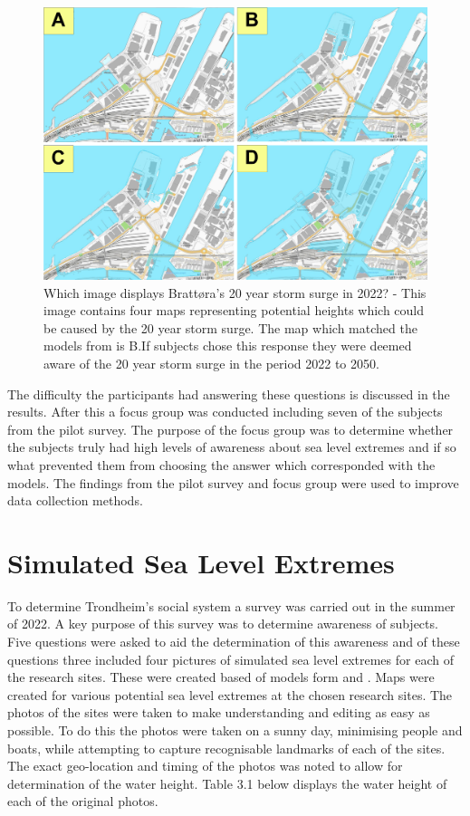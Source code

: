 \begin{figure}[h!]
    \centering
    \includegraphics[width=16cm]{fig/brattora question on 2022 20 yr storm surge quadrant.png}
    \caption{Which image displays Brattøra's 20 year storm surge in 2022? - This image contains four maps representing potential heights which could be caused by the 20 year storm surge. The map which matched the models from \cite{kartverket_se_2021} is B.If subjects chose this response they were deemed aware of the 20 year storm surge in the period 2022 to 2050.}
    \label{fig:brattora_2022_stormsurge}
\end{figure}

The difficulty the participants had answering these questions is discussed in the results. After this a focus group was conducted including seven of the subjects from the pilot survey. The purpose of the focus group was to determine whether the subjects truly had high levels of awareness about sea level extremes and if so what prevented them from choosing the answer which corresponded with the models. The findings from the pilot survey and focus group were used to improve data collection methods. 

\section{Simulated Sea Level Extremes}
To determine Trondheim's social system a survey was carried out in the summer of 2022. A key purpose of this survey was to determine awareness of subjects. 
Five questions were asked to aid the determination of this awareness and of these questions three included four pictures of simulated sea level extremes for each of the research sites. These were created based of models form \cite{dsb_integrating-sea-level-rise-and-storm-surges--local-planningpdf_2017} and \cite{kartverket_se_2020}. Maps were created for various potential sea level extremes at the chosen research sites. The photos of the sites were taken to make understanding and editing as easy as possible. To do this the photos were taken on a sunny day, minimising people and boats, while attempting to capture recognisable landmarks of each of the sites. The exact geo-location and timing of the photos was noted to allow for determination of the water height. Table 3.1 below displays the water height of each of the original photos. 

